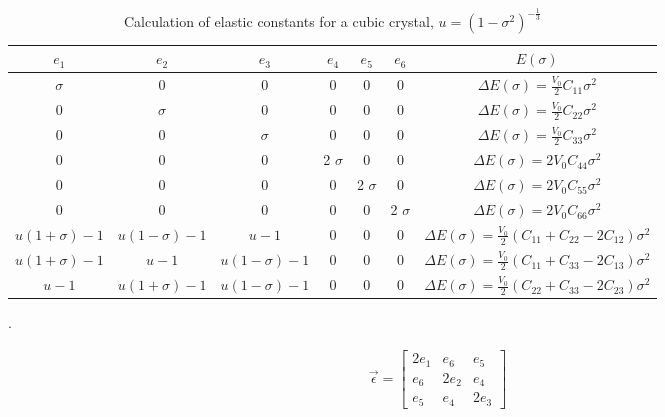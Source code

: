 \renewcommand{\arraystretch}{1.7}
\begin{table}[!htbp]
\centering
\begin{tabular}{c c c c c c c}
\hline\hline
$e_1$ & $e_2$ & $e_3$ & $e_4$ & $e_5$ & $e_6$ & $E(\sigma)$ \\
\hline\hline
$\sigma$ & 0 & 0 & 0 & 0 & 0 & $\Delta E(\sigma) = \frac{V_{0}}{2} C_{11} \sigma^2$ \\
0 & $\sigma$ & 0 & 0 & 0 & 0 & $\Delta E(\sigma) = \frac{V_{0}}{2} C_{22} \sigma^2$ \\
0 & 0 & $\sigma$ & 0 & 0 & 0 & $\Delta E(\sigma) = \frac{V_{0}}{2} C_{33} \sigma^2$ \\

0 & 0 & 0 & 2 $\sigma$ & 0 & 0 & $\Delta E(\sigma) = 2 V_{0} C_{44} \sigma^2$ \\
0 & 0 & 0 & 0 & 2 $\sigma$ & 0 & $\Delta E(\sigma) = 2 V_{0} C_{55} \sigma^2$ \\
0 & 0 & 0 & 0 & 0 & 2 $\sigma$ & $\Delta E(\sigma) = 2 V_{0} C_{66} \sigma^2$ \\

$u (1+\sigma) - 1$ & $u (1-\sigma) - 1$ & $u - 1$ & 0 & 0 & 0 & $\Delta E(\sigma) = \frac{V_{0}}{2} (C_{11} + C_{22} - 2 C_{12}) \sigma^2$ \\
$u (1+\sigma) - 1$ & $u - 1$ & $u (1-\sigma) - 1$ & 0 & 0 & 0 & $\Delta E(\sigma) = \frac{V_{0}}{2} (C_{11} + C_{33} - 2 C_{13}) \sigma^2$ \\
$u - 1$ & $u (1+\sigma) - 1$ & $u (1-\sigma) - 1$ & 0 & 0 & 0 & $\Delta E(\sigma) = \frac{V_{0}}{2} (C_{22} + C_{33} - 2 C_{23}) \sigma^2$ \\

\end{tabular}
\label{tab:ctcubic}
\caption{Calculation of elastic constants for a cubic crystal\cite{orthonisi}, $u = (1-\sigma^2)^{-\frac{1}{3}}$}.
\end{table}


\begin{equation}
\begin{split}
\vec{\epsilon} = \begin{bmatrix} 2 e_1 & e_6 & e_5 \\ e_6 & 2 e_2 & e_4 \\ e_5 & e_4 & 2 e_3 \end{bmatrix}
\end{split}
\label{eq:eqStrainMatrixCT}
\end{equation}











